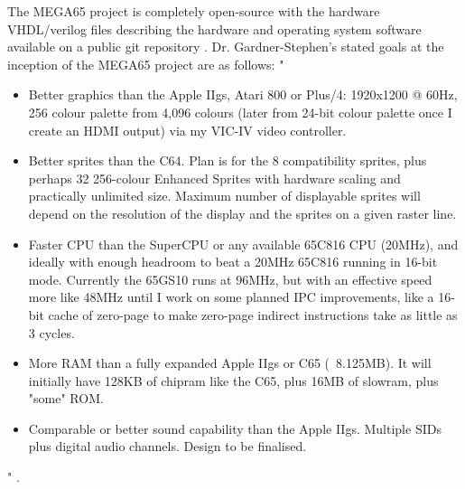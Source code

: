 The MEGA65 project is completely open-source with the hardware VHDL/verilog files describing the hardware and operating system software available on a public git repository \cite{MEGA65manual}. Dr. Gardner-Stephen's stated goals at the inception of the MEGA65 project are as follows: 
" \begin{itemize}
\item Better graphics than the Apple IIgs, Atari 800 or Plus/4: 1920x1200 @ 60Hz, 256 colour palette from 4,096 colours (later from 24-bit colour palette once I create an HDMI output) via my VIC-IV video controller.
 \item    Better sprites than the C64.  Plan is for the 8 compatibility sprites, plus perhaps 32 256-colour Enhanced Sprites with hardware scaling and practically unlimited size.  Maximum number of displayable sprites will depend on the resolution of the display and the sprites on a given raster line.
 \item    Faster CPU than the SuperCPU or any available 65C816 CPU (20MHz), and ideally with enough headroom to beat a 20MHz 65C816 running in 16-bit mode.  Currently the 65GS10 runs at 96MHz, but with an effective speed more like 48MHz until I work on some planned IPC improvements, like a 16-bit cache of zero-page to make zero-page indirect instructions take as little as 3 cycles.
 \item    More RAM than a fully expanded Apple IIgs or C65 (~8.125MB).  It will initially have 128KB of chipram like the C65, plus 16MB of slowram, plus "some" ROM.
 \item    Comparable or better sound capability than the Apple IIgs.  Multiple SIDs plus digital audio channels.  Design to be finalised.
\end{itemize} " \cite{blog30jan14}. \\\\

